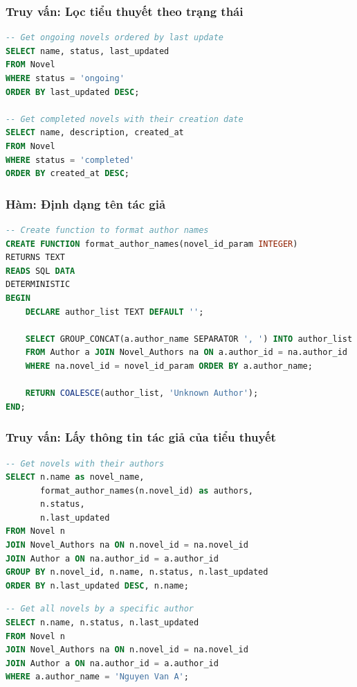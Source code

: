 \documentclass[12pt,aspectratio=169,handout]{beamer}
\begin{document}
\begin{frame}[fragile]
\frametitle{Truy vấn: Lọc tiểu thuyết theo trạng thái}
\begin{lstlisting}[language=SQL, basicstyle=\small\ttfamily]
-- Get ongoing novels ordered by last update
SELECT name, status, last_updated 
FROM Novel 
WHERE status = 'ongoing' 
ORDER BY last_updated DESC;

-- Get completed novels with their creation date
SELECT name, description, created_at
FROM Novel 
WHERE status = 'completed'
ORDER BY created_at DESC;
\end{lstlisting}
\end{frame}

\begin{frame}[fragile]
\frametitle{Hàm: Định dạng tên tác giả}
\begin{lstlisting}[language=SQL, basicstyle=\footnotesize\ttfamily]
-- Create function to format author names
CREATE FUNCTION format_author_names(novel_id_param INTEGER)
RETURNS TEXT
READS SQL DATA
DETERMINISTIC
BEGIN
    DECLARE author_list TEXT DEFAULT '';
    
    SELECT GROUP_CONCAT(a.author_name SEPARATOR ', ') INTO author_list
    FROM Author a JOIN Novel_Authors na ON a.author_id = na.author_id
    WHERE na.novel_id = novel_id_param ORDER BY a.author_name;
    
    RETURN COALESCE(author_list, 'Unknown Author');
END;
\end{lstlisting}
\end{frame}

\begin{frame}
\frametitle{Truy vấn: Lấy thông tin tác giả của tiểu thuyết}
\begin{lstlisting}[language=SQL, basicstyle=\small\ttfamily]
-- Get novels with their authors
SELECT n.name as novel_name, 
       format_author_names(n.novel_id) as authors, 
       n.status, 
       n.last_updated
FROM Novel n
JOIN Novel_Authors na ON n.novel_id = na.novel_id
JOIN Author a ON na.author_id = a.author_id
GROUP BY n.novel_id, n.name, n.status, n.last_updated
ORDER BY n.last_updated DESC, n.name;
\end{lstlisting}
\framebreak

\begin{lstlisting}[language=SQL, basicstyle=\small\ttfamily]
-- Get all novels by a specific author
SELECT n.name, n.status, n.last_updated
FROM Novel n
JOIN Novel_Authors na ON n.novel_id = na.novel_id
JOIN Author a ON na.author_id = a.author_id
WHERE a.author_name = 'Nguyen Van A';
\end{lstlisting}
\end{frame}
\end{document}
